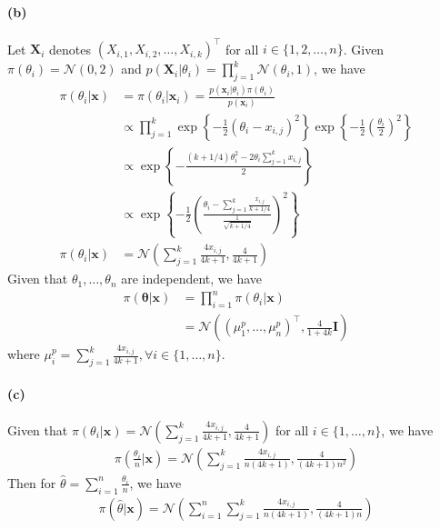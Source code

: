 \paragraph{(b)}
Let $\bm{X}_i$ denotes $(X_{i, 1}, X_{i, 2}, \dots, X_{i, k})^\top$ for all $i\in \{1, 2, \dots, n\}$. Given $\pi(\theta_i) = \mathcal{N}(0, 2)$ and $p(\bm{X}_i \vert \theta_i) = \prod_{j=1}^{k}\mathcal{N} (\theta_i, 1)$, we have
\begin{align*}
    \pi(\theta_i \vert \bm{x})
    &= \pi(\theta_i \vert \bm{x}_i) = \frac{p(\bm{x}_i \vert \theta_i) \pi(\theta_i)}{ p(\bm{x}_i)} \\
    &\propto \prod_{j=1}^{k} \exp\left\{ -\frac{1}{2} (\theta_i - x_{i, j})^2\right\} \exp\left\{ -\frac{1}{2} \left( \frac{\theta_i}{2} \right)^2\right\} \\
    &\propto \exp\left\{ -\frac{(k+1/4)\theta_i^2 - 2\theta_i \sum_{j=1}^{k}x_{i, j}}{2} \right\} \\
    &\propto \exp\left\{ -\frac{1}{2} \left( \frac{\theta_i - \sum_{j=1}^k \frac{x_{i,j}}{k+1/4}}{\frac{1}{\sqrt{k+1/4}}} \right)^2 \right\}\\
    \pi(\theta_i \vert \bm{x})
    &= \mathcal{N}\left( \sum_{j=1}^k \frac{4x_{i, j}}{4k+1}, \frac{4}{4k+1} \right)
\end{align*}
Given that $\theta_1, \dots, \theta_n$ are independent, we have
\begin{align*}
    \pi(\bm{\theta} \vert \bm{x})
    &= \prod_{i=1}^n \pi(\theta_i \vert \bm{x})\\
    &= \mathcal{N}\left( (\mu^p_1, \dots, \mu^p_n)^\top, \frac{4}{1+4k}\bm{I}\right)
\end{align*}
where $\mu^p_i = \sum_{j=1}^k \frac{4x_{i,j}}{4k+1}, \forall i \in \{1, \dots, n\}$.

\paragraph{(c)}

Given that $\pi(\theta_i \vert \bm{x}) = \mathcal{N}\left( \sum_{j=1}^k \frac{4x_{i, j}}{4k+1}, \frac{4}{4k+1} \right)$ for all $i\in \{1, \dots, n\}$, we have
\begin{align*}
    \pi\left( \frac{\theta_i}{n} \vert \bm{x} \right) = \mathcal{N}\left( \sum_{j=1}^k \frac{4x_{i, j}}{n(4k+1)}, \frac{4}{(4k+1)n^2} \right)
\end{align*}
Then for $\hat{\theta} = \sum_{i=1}^n \frac{\theta_i}{n}$, we have
\begin{align*}
    \pi\left( \hat{\theta} \vert \bm{x} \right) = \mathcal{N}\left(
    \sum_{i=1}^{n}\sum_{j=1}^k \frac{4x_{i,j}}{n(4k+1)}, \frac{4}{(4k+1)n}
    \right)
\end{align*}